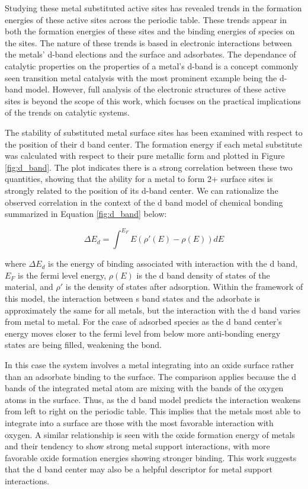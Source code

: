 \documentclass[catalysts,article,submit,moreauthors,pdftex,10pt,a4paper]{mdpi}
\theoremstyle{mdpi}
\newcounter{ex}
\newcounter{re}
\theoremstyle{mdpidefinition}
\begin{document}
Studying these metal substituted active sites has revealed trends in the formation energies of these active sites across the periodic table. These trends appear in both the formation energies of these sites and the binding energies of species on the sites. The nature of these trends is based in electronic interactions between the metals' d-band elections and the surface and adsorbates. The dependance of catalytic properties on the properties of a metal's d-band is a concept commonly seen transition metal catalysis\cite{Hammer_2000} with the most prominent example being the d-band model\cite{Nilsson_2008, Greeley_2002}. However, full analysis of the electronic structures of these active sites is beyond the scope of this work, which focuses on the practical implications of the trends on catalytic systems.

The stability of substituted metal surface sites has been examined with respect to the position of their d band center. The formation energy if each metal substitute was calculated with respect to their pure metallic form and plotted in Figure \ref{fig:d_band}. The plot indicates there is a strong correlation between these two quantities, showing that the ability for a metal to form 2+ surface sites is strongly related to the position of its d-band center. We can rationalize the observed correlation in the context of the d band model of chemical bonding\cite{Nilsson_2008} summarized in Equation \ref{fig:d_band} below:

\begin{equation}
    \Delta E_d = \int^{E_F} E(\rho'(E) - \rho(E))dE
    \label{eq:d_band}
\end{equation}

where $\Delta E_d$ is the energy of binding associated with interaction with the d band, $E_F$ is the fermi level energy, $\rho(E)$ is the d band density of states of the material, and $\rho'$ is the density of states after adsorption. Within the framework of this model, the interaction between s band states and the adsorbate is approximately the same for all metals, but the interaction with the d band varies from metal to metal. For the case of adsorbed species as the d band center's energy moves closer to the fermi level from below more anti-bonding energy states are being filled, weakening the bond.

In this case the system involves a metal integrating into an oxide surface rather than an adsorbate binding to the surface. The comparison applies because the d bands of the integrated metal atom are mixing with the bands of the oxygen atoms in the surface. Thus, as the d band model predicts the interaction weakens from left to right on the periodic table. This implies that the metals most able to integrate into a surface are those with the most favorable interaction with oxygen. A similar relationship is seen with the oxide formation energy of metals and their tendency to show strong metal support interactions\cite{O_Connor_2018}, with more favorable oxide formation energies showing stronger binding. This work suggests that the d band center may also be a helpful descriptor for metal support interactions.
\end{document}
